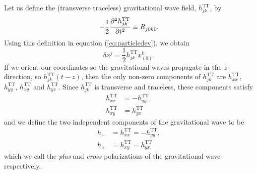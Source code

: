 Let us define the (transverse traceless) gravitational wave field,
$h_{jk}^\mathrm{TT}$, by
\begin{equation}
-\frac{1}{2} \frac{\partial^2 h_{jk}^\mathrm{TT}}{\partial t^2} \equiv
\tensor{R}{_{j0k0}}.
\label{eq:hjkdef}
\end{equation}
Using this definition in equation (\ref{eq:particledev}), we obtain
\begin{equation}
\delta x^j = \frac{1}{2} h_{jk}^\mathrm{TT} x_{(0)}^k.
\end{equation}
If we orient our coordinates so the gravitational waves propagate in the
$z$-direction, so $h_{jk}^\mathrm{TT}(t-z)$, then the only non-zero components
of $h_{jk}^\mathrm{TT}$ are $h_{xx}^\mathrm{TT}$, $h_{yy}^\mathrm{TT}$,
$h_{xy}^\mathrm{TT}$ and $h_{yx}^\mathrm{TT}$. Since $h_{jk}^\mathrm{TT}$ is
transverse and traceless, these components satisfy
\begin{align}
h_{xx}^\mathrm{TT} &= - h_{yy}^\mathrm{TT}, \\
h_{xy}^\mathrm{TT} &= h_{yx}^\mathrm{TT}
\end{align}
and we define the two independent components of the gravitational wave to be
\begin{align}
h_{+} &= h_{xx}^\mathrm{TT} = - h_{yy}^\mathrm{TT}, \\
h_{\times} &= h_{xy}^\mathrm{TT} = h_{yx}^\mathrm{TT}
\end{align}
which we call the \emph{plus} and \emph{cross} polarizations of the
gravitational wave respectively.

